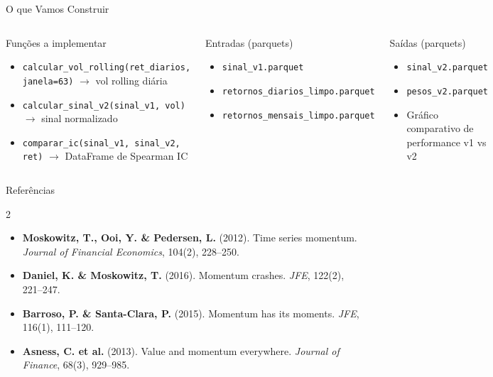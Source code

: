 \documentclass[aspectratio=169,12pt]{beamer}
\begin{document}
\begin{frame}[fragile]{O que Vamos Construir}
\begin{columns}[T]
\begin{block}{Funções a implementar}
\begin{itemize}
  \item \texttt{calcular\_vol\_rolling(ret\_diarios, janela=63)} $\to$ vol rolling diária
  \item \texttt{calcular\_sinal\_v2(sinal\_v1, vol)} $\to$ sinal normalizado
  \item \texttt{comparar\_ic(sinal\_v1, sinal\_v2, ret)} $\to$ DataFrame de Spearman IC
\end{itemize}
\end{block}
\begin{block}{Entradas (parquets)}
\begin{itemize}
  \item \texttt{sinal\_v1.parquet}
  \item \texttt{retornos\_diarios\_limpo.parquet}
  \item \texttt{retornos\_mensais\_limpo.parquet}
\end{itemize}
\end{block}
\vspace{.4em}
\begin{exampleblock}{Saídas (parquets)}
\begin{itemize}
  \item \texttt{sinal\_v2.parquet}
  \item \texttt{pesos\_v2.parquet}
  \item Gráfico comparativo de performance v1 vs v2
\end{itemize}
\end{exampleblock}
\end{columns}
\end{frame}

\begin{frame}[fragile]{Referências}
\begin{multicols}{2}
\tiny
\begin{itemize}
  \item \textbf{Moskowitz, T., Ooi, Y. \& Pedersen, L.} (2012). Time series momentum. \textit{Journal of Financial Economics}, 104(2), 228--250.
  \item \textbf{Daniel, K. \& Moskowitz, T.} (2016). Momentum crashes. \textit{JFE}, 122(2), 221--247.
  \item \textbf{Barroso, P. \& Santa-Clara, P.} (2015). Momentum has its moments. \textit{JFE}, 116(1), 111--120.
  \item \textbf{Asness, C. et al.} (2013). Value and momentum everywhere. \textit{Journal of Finance}, 68(3), 929--985.
\end{itemize}
\end{multicols}
\end{frame}
\end{document}
